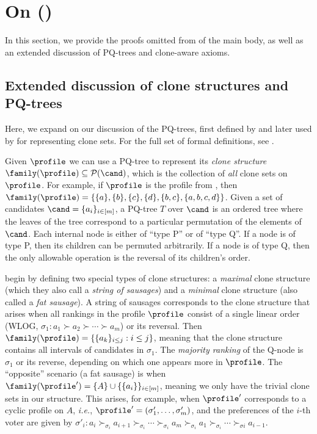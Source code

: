 \section{On  ()}

In this section, we provide the proofs omitted from  of the main body, as well as an extended discussion of PQ-trees and clone-aware axioms. 

\subsection{Extended discussion of clone structures and PQ-trees}\label{subsec:extended_pqtrees}
Here, we expand on our discussion of the PQ-trees, first defined by \citet{Booth76:Testing} and later used by \citet{Elkind10:Clone} for representing clone sets. For the full set of formal definitions, see \citet{Elkind10:Clone}. 

Given $\profile$ we can use a PQ-tree to represent its \emph{clone structure} $\family(\profile) \subseteq \mathcal{P}(\cand)$, which is the collection of \textit{all} clone sets on $\profile$. For example, if $\profile$ is the profile from , then $\family(\profile)=\{\{a\},\{b\}, \{c\}, \{d\}, \{b,c\}, \{a,b,c,d\}\}$.
Given a set of candidates $\cand=\{a_i\}_{i \in [m]}$, a PQ-tree $T$ over $\cand$ is an ordered tree where the leaves of the tree correspond to a particular permutation of the elements of $\cand$.
Each internal node is either of ``type P'' or of ``type Q''. 
If a node is of type P, then its children can be permuted arbitrarily. 
If a node is of type Q, then the only allowable operation is the reversal of its children's order.

\citet{Elkind10:Clone} begin by defining two special types of clone structures: a \emph{maximal} clone structure (which they also call a \emph{string of sausages}) and a \emph{minimal} clone structure (also called a \emph{fat sausage}). 
A string of sausages corresponds to the clone structure that arises when all rankings in the profile $\profile$ consist of a single linear order (WLOG, $\sigma_1 : a_1 \succ a_2 \succ \cdots \succ a_m$) or its reversal. Then $\family(\profile) = \{ \{a_k\}_{i \leq j}: i \leq j\}$, meaning that the clone structure contains all intervals of candidates in $\sigma_1$. The \emph{majority ranking} of the Q-node is $\sigma_1$ or its reverse, depending on which one appears more in $\profile$. The ``opposite'' scenario (a fat sausage) is when $\family(\profile') = \{A\} \cup \{\{a_i\}\}_{i \in [m]}$, meaning we only have the trivial clone sets in our structure. This arises, for example, when $\profile'$ corresponds to a cyclic profile on $A$, \emph{i.e.}, $\profile' = (\sigma_1', \ldots, \sigma'_m)$, and the preferences of the $i$-th voter are given by $\sigma'_i : a_i \succ_{\sigma_i} a_{i+1} \succ_{\sigma_i} \cdots \succ_{\sigma_i} a_m \succ_{\sigma_i} a_1 \succ_{\sigma_i} \cdots \succ_{\sigma{i}} a_{i-1}$.

